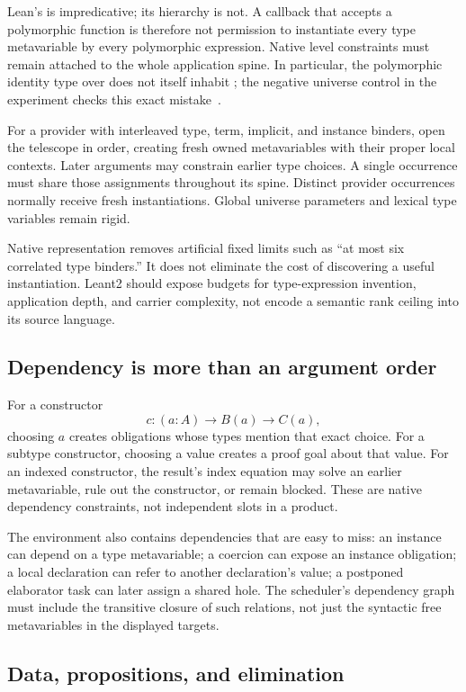 Lean's  is impredicative; its  hierarchy is not. A callback that accepts a polymorphic function is therefore not permission to instantiate every type metavariable by every polymorphic expression. Native level constraints must remain attached to the whole application spine. In particular, the polymorphic identity type over  does not itself inhabit ; the negative universe control in the experiment checks this exact mistake~\cite{lean-types,lean-universes}.

For a provider with interleaved type, term, implicit, and instance binders, open the telescope in order, creating fresh owned metavariables with their proper local contexts. Later arguments may constrain earlier type choices. A single occurrence must share those assignments throughout its spine. Distinct provider occurrences normally receive fresh instantiations. Global universe parameters and lexical type variables remain rigid.

Native representation removes artificial fixed limits such as ``at most six correlated type binders.'' It does not eliminate the cost of discovering a useful instantiation. Leant2 should expose budgets for type-expression invention, application depth, and carrier complexity, not encode a semantic rank ceiling into its source language.

\subsection{Dependency is more than an argument order}

For a constructor
\[
 c:(a:A)\to B(a)\to C(a),
\]
choosing $a$ creates obligations whose types mention that exact choice. For a subtype constructor, choosing a value creates a proof goal about that value. For an indexed constructor, the result's index equation may solve an earlier metavariable, rule out the constructor, or remain blocked. These are native dependency constraints, not independent slots in a product.

The environment also contains dependencies that are easy to miss: an instance can depend on a type metavariable; a coercion can expose an instance obligation; a local declaration can refer to another declaration's value; a postponed elaborator task can later assign a shared hole. The scheduler's dependency graph must include the transitive closure of such relations, not just the syntactic free metavariables in the displayed targets.

\subsection{Data, propositions, and elimination}

